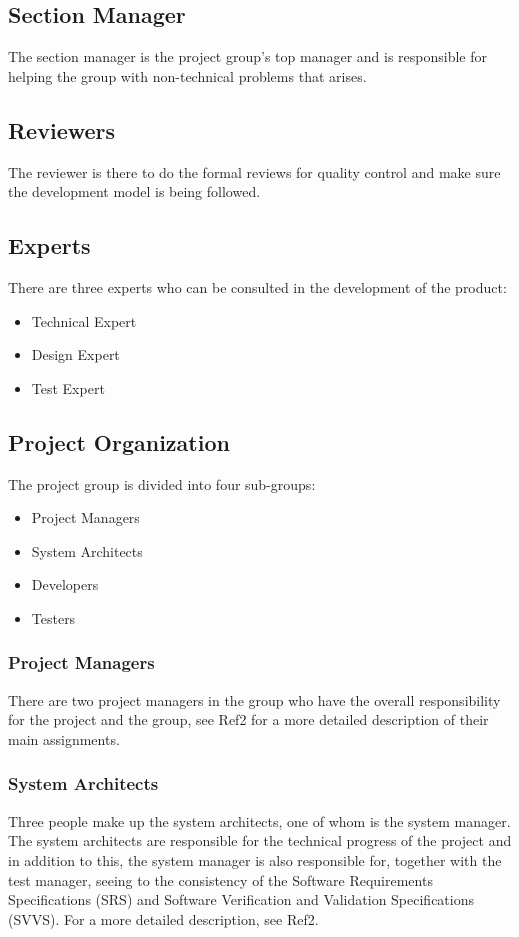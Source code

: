 \documentclass[a4paper]{article}
\begin{document}
\subsection{Section Manager}
The section manager is the project group's top manager and is responsible for helping the group with non-technical problems that arises.

\subsection{Reviewers}
The reviewer is there to do the formal reviews for quality control and make sure the development model is being followed.

\subsection{Experts}
There are three experts who can be consulted in the development of the product:
\begin{itemize}
\item Technical Expert
\item Design Expert
\item Test Expert
\end{itemize}

\subsection{Project Organization}

The project group is divided into four sub-groups:
\begin{itemize}
\item Project Managers
\item System Architects
\item Developers
\item Testers
\end{itemize}

\subsubsection{Project Managers}
There are two project managers in the group who have the overall responsibility for the project and the group, see Ref2 for a more detailed description of their main assignments.

\subsubsection{System Architects}
Three people make up the system architects, one of whom is the system manager. The system architects are responsible for the technical progress of the project and in addition to this, the system manager is also responsible for, together with the test manager, seeing to the consistency of the Software Requirements Specifications (SRS) and Software Verification and Validation Specifications (SVVS). For a more detailed description, see Ref2.
\end{document}
